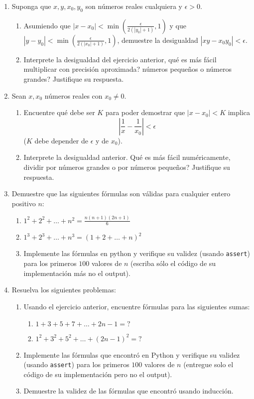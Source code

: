 \documentclass[12pt, a4paper]{article}
\begin{document}
\begin{enumerate}
\item Suponga que $x,y,x_0,y_0$ son números reales cualquiera y $\epsilon>0$. 
\begin{enumerate}
\item Asumiendo que $|x-x_0|<\min\left(\frac{\epsilon}{2(|y_0|+1)},1\right)$ y que $|y-y_0|<\min\left(\frac{\epsilon}{2(|x_0|+1)},1\right)$, demuestre la desigualdad $|xy-x_0y_0|<\epsilon$.

\item Interprete la desigualdad del ejercicio anterior, qué es más fácil multiplicar con precisión aproximada? números pequeños o números grandes? Justifique su respuesta.
\end{enumerate}

\item Sean $x,x_0$ números reales con $x_0\neq 0$. 
\begin{enumerate}
\item Encuentre qué debe ser $K$ para poder demostrar que  $|x-x_0|<K$ implica 
\[\left|\frac{1}{x}-\frac{1}{x_0}\right|<\epsilon\]
($K$ debe depender de $\epsilon$ y de $x_0$).

\item Interprete la desigualdad anterior. Qué es más fácil numéricamente, dividir por números grandes o por números peque\~nos? Justifique su respuesta.
\end{enumerate}

\item Demuestre que las siguientes fórmulas son válidas para cualquier entero positivo $n$:
\begin{enumerate}
\item $1^2+2^2+\dots+n^2 = \frac{n(n+1)(2n+1)}{6}$
\item $1^3+2^3+\dots+n^3 = (1+2+\dots+n)^2$
\item Implemente las fórmulas en python y verifique su validez (usando \verb!assert!) para los primeros $100$ valores de $n$ (escriba sólo el código de su implementación más no el output).
\end{enumerate} 

\item Resuelva los siguientes problemas:
\begin{enumerate}
\item
Usando el ejercicio anterior, encuentre fórmulas para las siguientes sumas: 
\begin{enumerate}
\item $1+3+5+7+\dots+ 2n-1 = ?$
\item $1^2+3^2+5^2+\dots+ (2n-1)^2 = ?$
\end{enumerate}
\item Implemente las fórmulas que encontró en Python y verifique su validez (usando \verb!assert!) para los primeros $100$ valores de $n$ (entregue solo el código de su implementación pero no el output).
\item Demuestre la validez de las fórmulas que encontró usando inducción.
\end{enumerate}


\end{enumerate}
\end{document}
